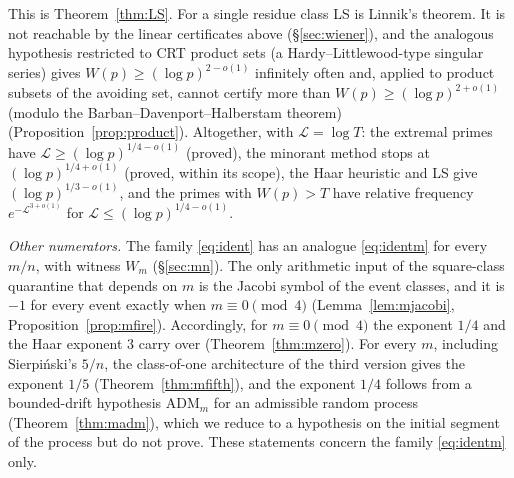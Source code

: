 \documentclass[11pt,reqno]{amsart}
\theoremstyle{definition}
\newcommand{\Lc}{\mathcal L}
\begin{document}
This is Theorem~\ref{thm:LS}.  For a single residue class LS is Linnik's
theorem.  It is not reachable by the linear certificates above
(\S\ref{sec:wiener}), and the analogous hypothesis restricted to CRT product
sets (a Hardy--Littlewood-type singular series) gives
$W(p)\ge(\log p)^{2-o(1)}$ infinitely often and, applied to product subsets of
the avoiding set, cannot certify more than $W(p)\ge(\log p)^{2+o(1)}$ (modulo the
Barban--Davenport--Halberstam theorem)
(Proposition~\ref{prop:product}).  Altogether, with
$\Lc=\log T$: the extremal primes have $\Lc\ge(\log p)^{1/4-o(1)}$ (proved), the
minorant method stops at $(\log p)^{1/4+o(1)}$ (proved, within its scope), the
Haar heuristic and LS give $(\log p)^{1/3-o(1)}$, and the primes with
$W(p)>T$ have relative frequency $e^{-\Lc^{3+o(1)}}$ for $\Lc\le(\log p)^{1/4-o(1)}$.

\emph{Other numerators.}  The family \eqref{eq:ident} has an analogue
\eqref{eq:identm} for every $m/n$, with witness $W_m$ (\S\ref{sec:mn}).  The
only arithmetic input of the square-class quarantine that depends on $m$ is
the Jacobi symbol of the event classes, and it is $-1$ for every event
exactly when $m\equiv0\pmod4$ (Lemma~\ref{lem:mjacobi},
Proposition~\ref{prop:mfire}).  Accordingly, for $m\equiv0\pmod4$ the exponent
$1/4$ and the Haar exponent $3$ carry over (Theorem~\ref{thm:mzero}).  For
every $m$, including Sierpi\'nski's $5/n$, the class-of-one architecture of
the third version gives the exponent $1/5$ (Theorem~\ref{thm:mfifth}), and
the exponent $1/4$ follows from a bounded-drift hypothesis
$\mathrm{ADM}_m$ for an admissible random process (Theorem~\ref{thm:madm}),
which we reduce to a hypothesis on the initial segment of the process but
do not prove.  These statements concern the family \eqref{eq:identm} only.
\end{document}

